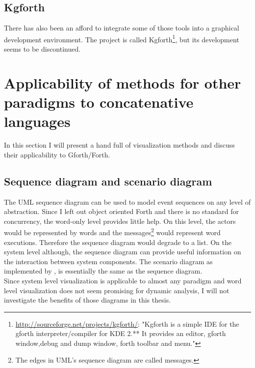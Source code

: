 \subsection*{Kgforth}

There has also been an afford to integrate some of those tools into a graphical development environment. The project is called Kgforth\footnote{\url{http://sourceforge.net/projects/kgforth/}: "Kgforth is a simple IDE for the gforth interpreter/compiler for KDE 2.** 
It provides an editor, gforth window,debug and dump window, forth toolbar and menu."}, but its development seems to be discontinued.

\section{Applicability of methods for other paradigms to concatenative languages}

In this section I will present a hand full of visualization methods and discuss their applicability to Gforth/Forth. 

\subsection*{Sequence diagram and scenario diagram}

The \gls{UML} sequence diagram can be used to model event sequences on any level of abstraction. Since I left out object oriented Forth and there is no standard for concurrency, the word-only level provides little help. On this level, the actors would be represented by words and the messages\footnote{The edges in UML's sequence diagram are called messages.} would represent word executions. Therefore the sequence diagram would degrade to a list. On the system level although, the sequence diagram can provide useful information on the interaction between system components. The scenario diagram as implemented by \cite{Koskimies:1996:SUS:871313}, is essentially the same as the sequence diagram.
\\
Since system level visualization is applicable to almost any paradigm and word level visualization does not seem promising for dynamic analysis, I will not investigate the benefits of those diagrams in this thesis.

